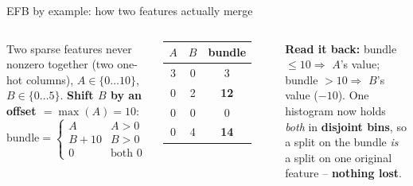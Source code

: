 \documentclass[aspectratio=169]{beamer}
\begin{document}
\begin{frame}{EFB by example: how two features actually merge}
  \begin{columns}[T]
    Two sparse features never nonzero together (two one-hot columns), $A \in \{0\ldots10\}$,
    $B \in \{0\ldots5\}$. \textbf{Shift $B$ by an offset $=\max(A)=10$}:
    \[
      \text{bundle} =
      \begin{cases}
        A & A > 0\\ B + 10 & B > 0\\ 0 & \text{both } 0
      \end{cases}
    \]
    \begin{center}\small
      \renewcommand{\arraystretch}{1.0}
      \begin{tabular}{ccc}
        \toprule $A$ & $B$ & bundle \\ \midrule
        3 & 0 & 3 \\ 0 & 2 & \textbf{12} \\ 0 & 0 & 0 \\ 0 & 4 & \textbf{14} \\ \bottomrule
      \end{tabular}
    \end{center}
    \begin{center}
    \end{center}
    \textbf{Read it back:} bundle $\le 10 \Rightarrow$ $A$'s value; bundle $> 10 \Rightarrow$
    $B$'s value ($-10$).
    \vskip 3pt
    One histogram now holds \emph{both} in \textbf{disjoint bins}, so a split on the bundle
    \emph{is} a split on one original feature -- \textbf{nothing lost}.
  \end{columns}
  \vfill
\end{frame}
\end{document}
